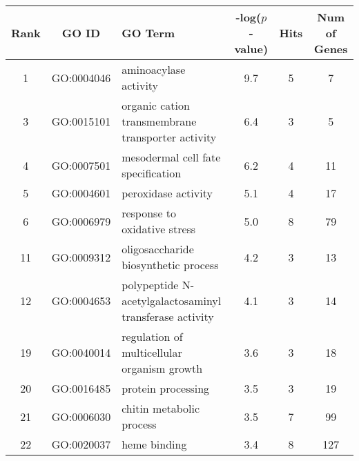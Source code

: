 \centering \begin{tabular}{c|c|p{3in}|c|c|c}
Rank	&GO ID	&GO Term	&-log($p$-value)	&Hits	&Num of Genes\\\hline
1	&GO:0004046	&aminoacylase activity	&9.7	&5	&7\\
3	&GO:0015101	&organic cation transmembrane transporter activity	&6.4	&3	&5\\
4	&GO:0007501	&mesodermal cell fate specification	&6.2	&4	&11\\
5	&GO:0004601	&peroxidase activity	&5.1	&4	&17\\
6	&GO:0006979	&response to oxidative stress	&5.0	&8	&79\\
11	&GO:0009312	&oligosaccharide biosynthetic process	&4.2	&3	&13\\
12	&GO:0004653	&polypeptide N-acetylgalactosaminyl transferase activity	
&4.1	&3	&14\\
19	&GO:0040014	&regulation of multicellular organism growth	&3.6	&3	&18\\
20	&GO:0016485	&protein processing	&3.5	&3	&19\\
21	&GO:0006030	&chitin metabolic process	&3.5	&7	&99\\
22	&GO:0020037	&heme binding	&3.4	&8	&127\\

\end{tabular}
